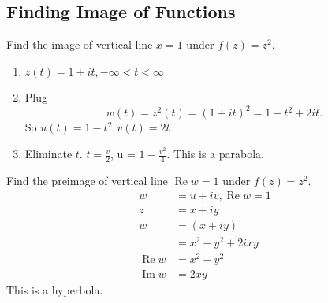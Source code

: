 \subsection{Finding Image of Functions}

\begin{example}
	Find the image of vertical line $x=1$ under $f(z) = z^2$.
\begin{enumerate}
	\item $z(t) = 1 + it, -\infty <t<\infty $
	\item Plug \[
	w(t) = z^2 (t) = (1+it)^2 = 1-t^2 + 2 it
	.\] 
	So $u(t) = 1-t^2, v(t) = 2t$
\item Eliminate  $t$. $t = \frac{v}{2}$, u = $1-\frac{v^2}{4}$. This is a parabola.
\end{enumerate}
\end{example}
\begin{example}
	Find the preimage of vertical line $\operatorname{Re} w = 1$ under $f(z) = z^2$.
	\begin{align*}
		w &=  u + iv, \operatorname{Re} w = 1 \\
		z &=  x + iy \\
		w &=  (x+iy) \\
		&= x^2 - y^2 + 2 i xy \\
		\operatorname{Re}  w &= x^2 - y^2\\
		\operatorname{Im}  w &=  2x y
	\end{align*}
	This is a hyperbola.
	
\end{example}

